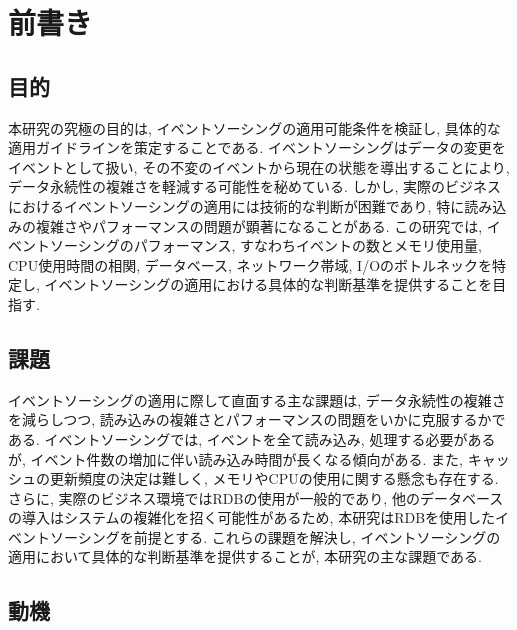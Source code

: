 \documentclass[../../main]{subfiles}
\begin{document}
    \section{前書き}\label{sec:preface}

    \subsection{目的}\label{subsec:preface-purpose}

    本研究の究極の目的は, イベントソーシングの適用可能条件を検証し, 具体的な適用ガイドラインを策定することである. イベントソーシングはデータの変更をイベントとして扱い, その不変のイベントから現在の状態を導出することにより, データ永続性の複雑さを軽減する可能性を秘めている. しかし, 実際のビジネスにおけるイベントソーシングの適用には技術的な判断が困難であり, 特に読み込みの複雑さやパフォーマンスの問題が顕著になることがある. この研究では, イベントソーシングのパフォーマンス, すなわちイベントの数とメモリ使用量, CPU使用時間の相関, データベース, ネットワーク帯域, I/Oのボトルネックを特定し, イベントソーシングの適用における具体的な判断基準を提供することを目指す.

    \subsection{課題}\label{subsec:preface-problem}

    イベントソーシングの適用に際して直面する主な課題は, データ永続性の複雑さを減らしつつ, 読み込みの複雑さとパフォーマンスの問題をいかに克服するかである. イベントソーシングでは, イベントを全て読み込み, 処理する必要があるが, イベント件数の増加に伴い読み込み時間が長くなる傾向がある. また, キャッシュの更新頻度の決定は難しく, メモリやCPUの使用に関する懸念も存在する. さらに, 実際のビジネス環境ではRDBの使用が一般的であり, 他のデータベースの導入はシステムの複雑化を招く可能性があるため, 本研究はRDBを使用したイベントソーシングを前提とする. これらの課題を解決し, イベントソーシングの適用において具体的な判断基準を提供することが, 本研究の主な課題である.

    \subsection{動機}\label{subsec:preface-motive}
\end{document}
